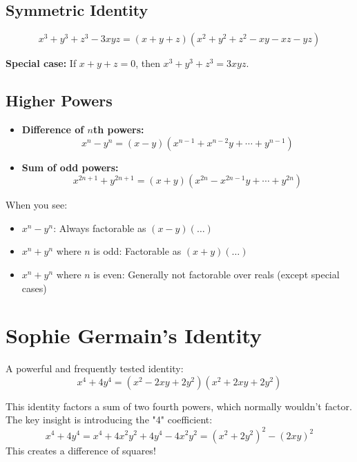 \documentclass[12pt]{extarticle}
\begin{document}
\subsection*{Symmetric Identity}

\[
x^3+y^3+z^3-3xyz = (x+y+z)(x^2+y^2+z^2-xy-xz-yz)
\]

\begin{remarkbox}
\textbf{Special case:} If $x+y+z=0$, then $x^3+y^3+z^3 = 3xyz$.
\end{remarkbox}

\subsection*{Higher Powers}

\begin{itemize}
\item \textbf{Difference of $n$th powers:}
\[
x^n - y^n = (x-y)(x^{n-1}+x^{n-2}y+\cdots+y^{n-1})
\]

\item \textbf{Sum of odd powers:}
\[
x^{2n+1}+y^{2n+1} = (x+y)(x^{2n}-x^{2n-1}y+\cdots+y^{2n})
\]
\end{itemize}

\begin{conceptbox}
When you see:
\begin{itemize}
    \item $x^n - y^n$: Always factorable as $(x-y)(\ldots)$
    \item $x^n + y^n$ where $n$ is odd: Factorable as $(x+y)(\ldots)$
    \item $x^n + y^n$ where $n$ is even: Generally not factorable over reals (except special cases)
\end{itemize}
\end{conceptbox}

\section{Sophie Germain's Identity}

A powerful and frequently tested identity:
\[
x^4 + 4y^4 = (x^2 - 2xy + 2y^2)(x^2 + 2xy + 2y^2)
\]

\begin{conceptbox}
This identity factors a sum of two fourth powers, which normally wouldn't factor. The key insight is introducing the "4" coefficient:
\[
x^4 + 4y^4 = x^4 + 4x^2y^2 + 4y^4 - 4x^2y^2 = (x^2+2y^2)^2 - (2xy)^2
\]
This creates a difference of squares!
\end{conceptbox}
\end{document}
